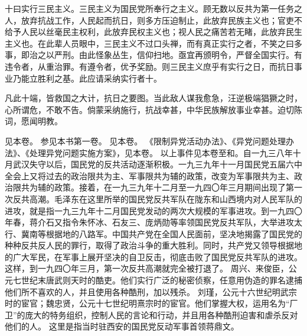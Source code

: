 十曰实行三民主义。三民主义为国民党所奉行之主义。顾无数以反共为第一任务之人，放弃抗战工作，人民起而抗日，则多方压迫制止，此放弃民族主义也；官吏不给予人民以丝毫民主权利，此放弃民权主义也；视人民之痛苦若无睹，此放弃民生主义也。在此辈人员眼中，三民主义不过口头禅，而有真正实行之者，不笑之曰多事，即治之以严刑。由此怪象丛生，信仰扫地。亟宜再颁明令，严督全国实行。有违令者，从重治罪。有遵令者，优予奖励。则三民主义庶乎有实行之日，而抗日事业乃能立胜利之基。此应请采纳实行者十。

凡此十端，皆救国之大计，抗日之要图。当此敌人谋我愈急，汪逆极端猖獗之时，心所谓危，不敢不告。倘蒙采纳施行，抗战幸甚，中华民族解放事业幸甚。迫切陈词，愿闻明教。


\begin{maonote}
见本卷。
参见本书第一卷。
见本卷。
《限制异党活动办法》、《异党问题处理办法》、《处理异党问题实施方案》，见本卷。
以上事件见本卷至和。自一九三八年十月武汉失守以后，国民党的反共活动逐渐积极。一九三九年十一月国民党五届六中全会上又将过去的政治限共为主、军事限共为辅的政策，改变为军事限共为主、政治限共为辅的政策。接着，在一九三九年十二月至一九四〇年三月期间出现了第一次反共高潮。毛泽东在这里所举的国民党反共军队在陇东和山西境内对人民军队的进攻，就是指一九三九年十二月国民党发动的两次大规模的军事进攻。到一九四〇年春，蒋介石又指令朱怀冰、石友三、庞炳勋等率领国民党反共军队，大举进攻太行、冀南等根据地的八路军。中国共产党在全国人民面前，坚决地揭露了国民党的种种反共反人民的罪行，取得了政治斗争的重大胜利。同时，共产党又领导根据地的广大军民，在军事上展开坚决的自卫反击，彻底击败了国民党反共军队的进攻。这样，到一九四〇年三月，第一次反共高潮就完全被打退了。
周兴、来俊臣，公元七世纪末唐武则天时的酷吏。他们实行广泛的秘密侦察，任意用伪造的罪名逮捕他们所不喜欢的人，并且使用各种酷刑，加以残杀。
刘瑾，公元十六世纪明武宗时的宦官；魏忠贤，公元十七世纪明熹宗时的宦官。他们掌握大权，运用名为“厂卫”的庞大的特务组织，控制人民的言论和行动，并且用各种酷刑迫害和虐杀反对他们的人。
这里是指当时驻西安的国民党反动军事首领蒋鼎文。
\end{maonote}
